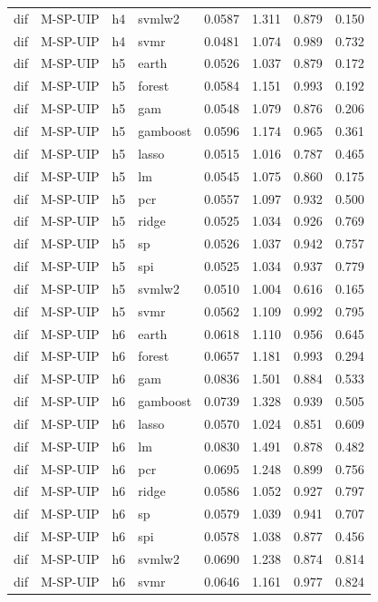 \begin{ThreePartTable}
\begin{longtable}[t]{llclcccc}
dif & M-SP-UIP & h4 & svmlw2 & 0.0587 & 1.311 & 0.879 & 0.150\\
dif & M-SP-UIP & h4 & svmr & 0.0481 & 1.074 & 0.989 & 0.732\\
\addlinespace
dif & M-SP-UIP & h5 & earth & 0.0526 & 1.037 & 0.879 & 0.172\\
dif & M-SP-UIP & h5 & forest & 0.0584 & 1.151 & 0.993 & 0.192\\
dif & M-SP-UIP & h5 & gam & 0.0548 & 1.079 & 0.876 & 0.206\\
dif & M-SP-UIP & h5 & gamboost & 0.0596 & 1.174 & 0.965 & 0.361\\
dif & M-SP-UIP & h5 & lasso & 0.0515 & 1.016 & 0.787 & 0.465\\
dif & M-SP-UIP & h5 & lm & 0.0545 & 1.075 & 0.860 & 0.175\\
dif & M-SP-UIP & h5 & pcr & 0.0557 & 1.097 & 0.932 & 0.500\\
dif & M-SP-UIP & h5 & ridge & 0.0525 & 1.034 & 0.926 & 0.769\\
dif & M-SP-UIP & h5 & sp & 0.0526 & 1.037 & 0.942 & 0.757\\
dif & M-SP-UIP & h5 & spi & 0.0525 & 1.034 & 0.937 & 0.779\\
dif & M-SP-UIP & h5 & svmlw2 & 0.0510 & 1.004 & 0.616 & 0.165\\
dif & M-SP-UIP & h5 & svmr & 0.0562 & 1.109 & 0.992 & 0.795\\
\addlinespace
dif & M-SP-UIP & h6 & earth & 0.0618 & 1.110 & 0.956 & 0.645\\
dif & M-SP-UIP & h6 & forest & 0.0657 & 1.181 & 0.993 & 0.294\\
dif & M-SP-UIP & h6 & gam & 0.0836 & 1.501 & 0.884 & 0.533\\
dif & M-SP-UIP & h6 & gamboost & 0.0739 & 1.328 & 0.939 & 0.505\\
dif & M-SP-UIP & h6 & lasso & 0.0570 & 1.024 & 0.851 & 0.609\\
dif & M-SP-UIP & h6 & lm & 0.0830 & 1.491 & 0.878 & 0.482\\
dif & M-SP-UIP & h6 & pcr & 0.0695 & 1.248 & 0.899 & 0.756\\
dif & M-SP-UIP & h6 & ridge & 0.0586 & 1.052 & 0.927 & 0.797\\
dif & M-SP-UIP & h6 & sp & 0.0579 & 1.039 & 0.941 & 0.707\\
dif & M-SP-UIP & h6 & spi & 0.0578 & 1.038 & 0.877 & 0.456\\
dif & M-SP-UIP & h6 & svmlw2 & 0.0690 & 1.238 & 0.874 & 0.814\\
dif & M-SP-UIP & h6 & svmr & 0.0646 & 1.161 & 0.977 & 0.824\\

\end{longtable}
\end{ThreePartTable}
